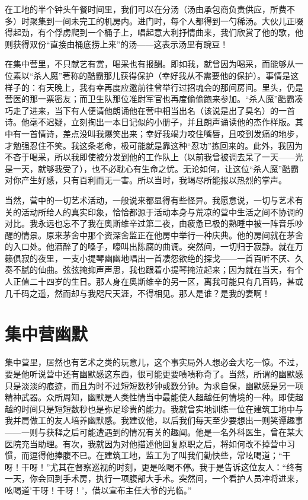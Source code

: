 \documentclass[11pt,oneside]{book}
\begin{document}
\begin{common-format}
在工地的半个钟头午餐时间里，我们可以在分汤（汤由承包商负责供应，所费不多）时聚集到一间未完工的机房内。进门时，每个人都得到一勺稀汤。大伙儿正啜得起劲，有个俘虏爬到一个桶子上，唱起意大利抒情曲来，我们欣赏了他的歌，他则获得双份“直接由桶底捞上来”的汤——这表示汤里有豌豆！

在集中营里，不只献艺有赏，喝采也有报酬。即如我，就曾因为喝采，而能够从一位素以“杀人魔”著称的酷霸那儿获得保护（幸好我从不需要他的保护）。事情是这样子的：有天晚上，我有幸再度应邀前往曾举行过招魂会的那间房间。里头，仍是营医的那一票密友；而卫生队那位准尉军官也再度偷偷跑来参加。“杀人魔”酷霸凑巧走了进来，当下有人便请他朗诵他在营中相当出名（该说是出了臭名）的一首诗。他毫不迟疑，立刻掏出一本日记似的小册子，并且朗声诵读他的杰作样版。其中有一首情诗，差点没叫我爆笑出来；幸好我竭力咬住嘴唇，且咬到发痛的地步，才勉强忍住不笑。我这条老命，极可能就是靠这种“忍功”拣回来的。此外，我因为不吝于喝采，所以我即使被分发到他的工作队上（以前我曾被调去呆了一天——光是一天，就够我受了），也不必耽心有生命之忧。无论如何，让这位“杀人魔”酷霸对你产生好感，只有百利而无一害。所以当时，我竭尽所能报以热烈的掌声。

当然，营中的一切艺术活动，一般说来都显得有些怪异。我愿意说，一切与艺术有关的活动所给人的真实印象，恰恰都源于活动本身与荒凉的营中生活之间不协调的对比。我永远也忘不了我在奥斯维辛过第二夜，由疲惫已极的熟睡中被一阵音乐吵醒的情景。原来茅舍中那个资深舍监正在他房中举行一种庆典。他的房间就在茅舍的入口处。他酒醉了的嗓子，嚎叫出陈腐的曲调。突然间，一切归于寂静。就在万籁俱寂的夜里，一支小提琴幽幽地唱出一首凄怨欲绝的探戈——一首百听不厌、久奏不腻的仙曲。弦弦掩抑声声思，我也跟着小提琴掩泣起来；因为就在当天，有个人正值二十四岁的生日。那人身在奥斯维辛的另一区，离我可能只有几百码，甚或几千码之遥，然而却与我咫尺天涯，不得相见。那人是谁？是我的妻啊！


\section{集中营幽默}
集中营里，居然也有艺术之类的玩意儿，这个事实局外人想必会大吃一惊。不过，要是他听说营中还有幽默感这东西，很可能更要啧啧称奇了。当然，所谓的幽默感只是淡淡的痕迹，而且为时不过短短数秒钟或数分钟。为求自保，幽默感是另一项精神武器。众所周知，幽默是人类性情当中最能使人超越任何情境的一种。即使超越的时间只是短短数秒也是弥足珍贵的能力。我就曾实地训练一位在建筑工地中与我并肩做工的友人培养幽默感。我建议他，以后我们每天至少要想出一则笑谭趣事——一则与获释之后可能遭遇到的情况有关的趣闻。他是一名外科医生，曾在某大医院充当助理。有次，我就因为对他描述他回复原职之后，将如何改不掉营中习惯，而逗得他捧腹不已。在建筑工地，监工为了叫我们勤快些，常吆喝道；“干呀！干呀！”尤其在督察巡视的时刻，更是吆喝不停。我于是告诉这位友人：“终有一天，你会回到手术房，执行一项腹部大手术。突然间，一个看护人员冲将进来，吆喝道'干呀！干呀！'，借以宣布主任大爷的光临。”


\end{common-format}
\end{document}
